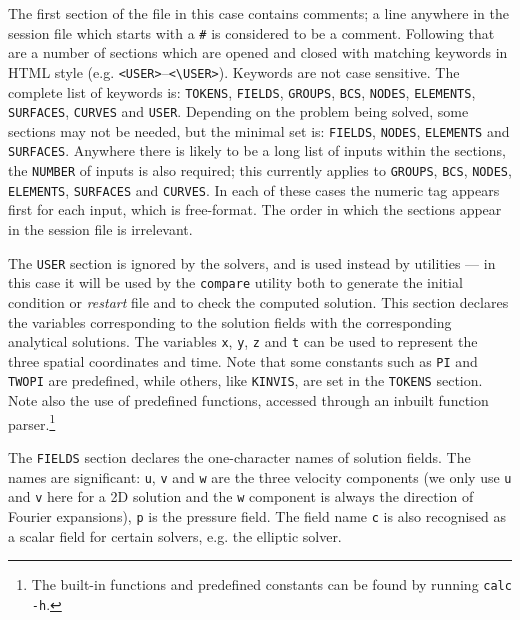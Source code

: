 \documentclass[11pt]{report}
\begin{document}
The first section of the file in this case contains comments; a line
anywhere in the session file which starts with a \verb+#+ is
considered to be a comment.  Following that are a number of sections
which are opened and closed with matching keywords in HTML style (e.g.
\verb+<USER>+--\verb+<\USER>+).  Keywords are not case sensitive.
The complete list of keywords is: \texttt{TOKENS}, \texttt{FIELDS}, 
\texttt{GROUPS}, \texttt{BCS}, \texttt{NODES}, \texttt{ELEMENTS}, 
\texttt{SURFACES}, \texttt{CURVES} and \texttt{USER}.  Depending on the
problem being solved, some sections may not be needed, but the minimal
set is: \texttt{FIELDS}, \texttt{NODES}, \texttt{ELEMENTS} and
\texttt{SURFACES}.  Anywhere there is likely to be a long list of
inputs within the sections, the \texttt{NUMBER} of inputs is also
required; this currently applies to \texttt{GROUPS}, \texttt{BCS},
\texttt{NODES}, \texttt{ELEMENTS}, \texttt{SURFACES} and
\texttt{CURVES}.  In each of these cases the numeric tag appears first for
each input, which is free-format.  The order in which the sections
appear in the session file is irrelevant.

The \texttt{USER} section is ignored by the solvers, and is used
instead by utilities --- in this case it will be used by the
\texttt{compare} utility both to generate the initial condition or
\emph{restart} file and to check the computed solution.  This
section declares the variables corresponding to the solution fields
with the corresponding analytical solutions.  The variables
\texttt{x}, \texttt{y}, \texttt{z} and \texttt{t} can be used to
represent the three spatial coordinates and time.  Note that some
constants such as \texttt{PI} and \texttt{TWOPI} are predefined, while
others, like \texttt{KINVIS}, are set in the \texttt{TOKENS} section.
Note also the use of predefined functions, accessed through an inbuilt
function parser.\footnote{The built-in functions and predefined constants
can be found by running \texttt{calc -h}.}

The \texttt{FIELDS} section declares the one-character names of
solution fields.  The names are significant: \texttt{u}, \texttt{v}
and \texttt{w} are the three velocity components (we only use
\texttt{u} and \texttt{v} here for a 2D solution and the \texttt{w}
component is always the direction of Fourier expansions), \texttt{p}
is the pressure field.  The field name \texttt{c} is also recognised
as a scalar field for certain solvers, e.g. the elliptic solver.
\end{document}
